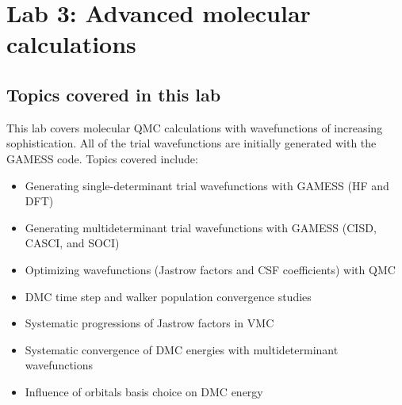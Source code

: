 \chapter{Lab 3: Advanced molecular calculations}
\label{chap:lab_advanced_molecules}

\section{Topics covered in this lab}
This lab covers molecular QMC calculations with wavefunctions of increasing sophistication.  All of the trial wavefunctions are initially generated with the GAMESS code.  Topics covered include:
\begin{itemize}
  \item{Generating single-determinant trial wavefunctions with GAMESS (HF and DFT)}
  \item{Generating multideterminant trial wavefunctions with GAMESS (CISD, CASCI, and SOCI)}
  \item{Optimizing wavefunctions (Jastrow factors and CSF coefficients) with QMC}
  \item{DMC time step and walker population convergence studies}
  \item{Systematic progressions of Jastrow factors in VMC}
  \item{Systematic convergence of DMC energies with multideterminant wavefunctions}
  \item{Influence of orbitals basis choice on DMC energy}
\end{itemize}


